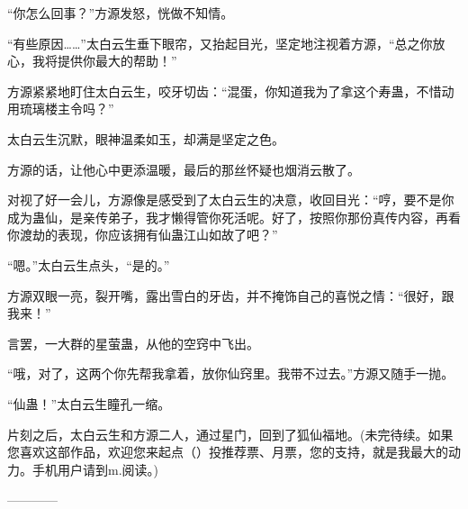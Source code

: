 \begin{this_body}
“你怎么回事？”方源发怒，恍做不知情。

“有些原因……”太白云生垂下眼帘，又抬起目光，坚定地注视着方源，“总之你放心，我将提供你最大的帮助！”

方源紧紧地盯住太白云生，咬牙切齿：“混蛋，你知道我为了拿这个寿蛊，不惜动用琉璃楼主令吗？”

太白云生沉默，眼神温柔如玉，却满是坚定之色。

方源的话，让他心中更添温暖，最后的那丝怀疑也烟消云散了。

对视了好一会儿，方源像是感受到了太白云生的决意，收回目光：“哼，要不是你成为蛊仙，是亲传弟子，我才懒得管你死活呢。好了，按照你那份真传内容，再看你渡劫的表现，你应该拥有仙蛊江山如故了吧？”

“嗯。”太白云生点头，“是的。”

方源双眼一亮，裂开嘴，露出雪白的牙齿，并不掩饰自己的喜悦之情：“很好，跟我来！”

言罢，一大群的星萤蛊，从他的空窍中飞出。

“哦，对了，这两个你先帮我拿着，放你仙窍里。我带不过去。”方源又随手一抛。

“仙蛊！”太白云生瞳孔一缩。

片刻之后，太白云生和方源二人，通过星门，回到了狐仙福地。(未完待续。如果您喜欢这部作品，欢迎您来起点（）投推荐票、月票，您的支持，就是我最大的动力。手机用户请到m.阅读。)

------------

\end{this_body}

